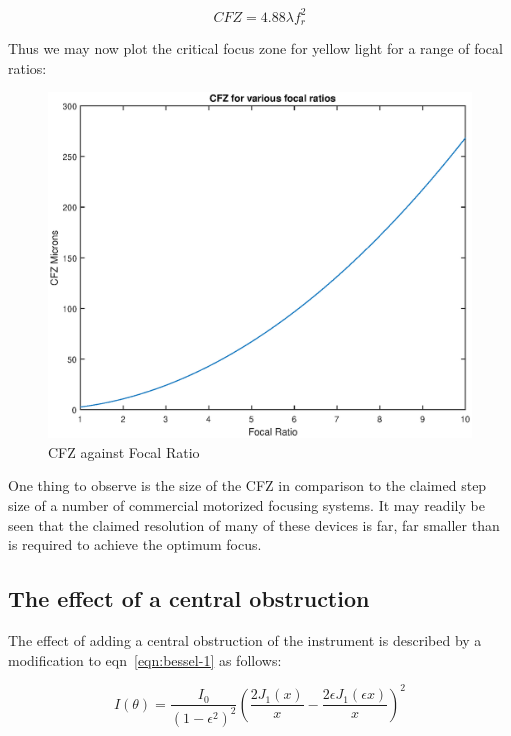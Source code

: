 \documentclass[11pt]{article}
\begin{document}
\begin{equation}
CFZ=4.88\lambda f_{r}^2
\end{equation}

Thus we may now plot the critical focus zone for yellow light for a range of focal ratios:

\begin{figure}[htb]
	\begin{center}
		\includegraphics[scale=0.7]{cfz-fratio.eps}
		\caption{CFZ against Focal Ratio}
		\label{fig:cfz-plot}
	\end{center}
\end{figure}

One thing to observe is the size of the CFZ in comparison to the claimed step size of a number of commercial motorized focusing systems. It may readily be seen that the claimed resolution of many of these devices is far, far smaller than is required to achieve the optimum focus.  

\subsection{The effect of a central obstruction}

The effect of adding a central obstruction of the instrument is described by a modification to eqn~\ref{eqn:bessel-1} as follows:

\begin{equation}
I(\theta) =  \frac{I_{0}}{\left( 1-\epsilon^2 \right) ^2}     
\left(
\frac{2J_{1}(x)}{x} - \frac{2\epsilon J_{1}(\epsilon x)}{x}
\right)^{2}
\end{equation}
\end{document}
